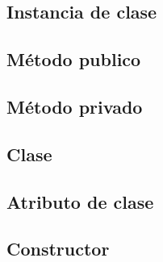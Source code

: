 \documentclass{article}
\newcommand{\insertverbbox}{{\addvbuffer[6pt 3pt]{\theverbbox}\par}}
\begin{document}
    \subsection*{Instancia de clase}
    
    \begin{verbbox}
    	
    \end{verbbox}
    \insertverbbox

    \subsection*{Método publico}
    
    \begin{verbbox}

    \end{verbbox}
    \insertverbbox
    
   	\subsection*{Método privado}
   	
   	\begin{verbbox}
   		
   	\end{verbbox}
   	\insertverbbox
    
   	\subsection*{Clase}
   	
   	\begin{verbbox}
   		
   	\end{verbbox}
   	\insertverbbox  
   	
   	\subsection*{Atributo de clase}
   	
   	\begin{verbbox}
   		
   	\end{verbbox}
   	\insertverbbox
   	
	\subsection*{Constructor}
	   	
	\begin{verbbox}
	   		
	\end{verbbox}
	\insertverbbox
    
\end{document}
